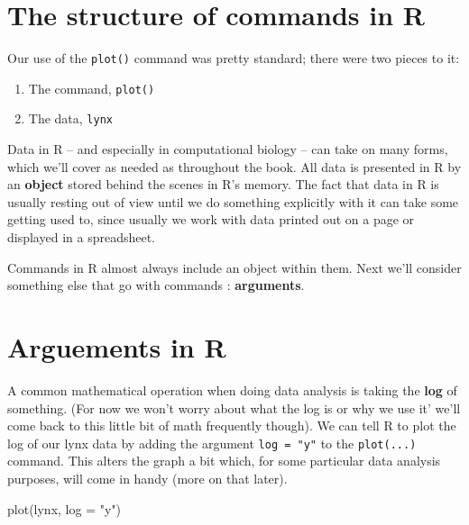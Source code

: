 \documentclass[
]{book}
\newenvironment{Shaded}{\begin{snugshade}}{\end{snugshade}}
\newcommand{\AttributeTok}[1]{\textcolor[rgb]{0.77,0.63,0.00}{#1}}
\newcommand{\FunctionTok}[1]{\textcolor[rgb]{0.00,0.00,0.00}{#1}}
\newcommand{\NormalTok}[1]{#1}
\newcommand{\StringTok}[1]{\textcolor[rgb]{0.31,0.60,0.02}{#1}}
\providecommand{\tightlist}{%
  \setlength{\itemsep}{0pt}\setlength{\parskip}{0pt}}
\begin{document}
\hypertarget{the-structure-of-commands-in-r}{%
\section{The structure of commands in R}\label{the-structure-of-commands-in-r}}

Our use of the \texttt{plot()} command was pretty standard; there were two pieces to it:

\begin{enumerate}
\def\labelenumi{\arabic{enumi}.}
\tightlist
\item
  The command, \texttt{plot()}
\item
  The data, \texttt{lynx}
\end{enumerate}

Data in R -- and especially in computational biology -- can take on many forms, which we'll cover as needed as throughout the book. All data is presented in R by an \textbf{object} stored behind the scenes in R's memory. The fact that data in R is usually resting out of view until we do something explicitly with it can take some getting used to, since usually we work with data printed out on a page or displayed in a spreadsheet.

Commands in R almost always include an object within them. Next we'll consider something else that go with commands : \textbf{arguments}.

\hypertarget{arguements-in-r}{%
\section{Arguements in R}\label{arguements-in-r}}

A common mathematical operation when doing data analysis is taking the \textbf{log} of something. (For now we won't worry about what the log is or why we use it' we'll come back to this little bit of math frequently though). We can tell R to plot the log of our lynx data by adding the argument \texttt{log\ =\ "y"} to the \texttt{plot(...)} command. This alters the graph a bit which, for some particular data analysis purposes, will come in handy (more on that later).

\begin{Shaded}
\begin{Highlighting}[]
\FunctionTok{plot}\NormalTok{(lynx, }\AttributeTok{log =} \StringTok{"y"}\NormalTok{)}
\end{Highlighting}
\end{Shaded}
\end{document}
